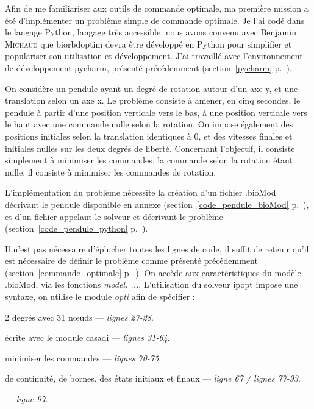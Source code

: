 Afin de me familiariser aux outils de commande optimale, ma première mission a été d'implémenter un problème simple de commande optimale. Je l'ai codé dans le langage Python, langage très accessible, nous avons convenu avec Benjamin \textsc{Michaud} que \gls{biorbdoptim} devra être développé en Python pour simplifier et populariser son utilisation et développement. J'ai travaillé avec l'environnement de développement \gls{pycharm}, présenté précédemment (section~\ref{pycharm} p.~\pageref{pycharm}).

On considère un pendule ayant un degré de rotation autour d'un axe y, et une translation selon un axe x. Le problème consiste à amener, en cinq secondes, le pendule à partir d'une position verticale vers le bas, à une position verticale vers le haut avec une commande nulle selon la rotation. On impose également des positions initiales selon la translation identiques à 0, et des vitesses finales et initiales nulles sur les deux degrés de liberté. Concernant l'objectif, il consiste simplement à minimiser les commandes, la commande selon la rotation étant nulle, il consiste à minimiser les commandes de rotation.

L'implémentation du problème nécessite la création d'un fichier .bioMod décrivant le pendule disponible en annexe 
(section~\ref{code_pendule_bioMod} p.~\pageref{code_pendule_bioMod}), et d'un fichier appelant le solveur et décrivant le problème (section~\ref{code_pendule_python} p.~\pageref{code_pendule_python}).

Il n'est pas nécessaire d’éplucher toutes les lignes de code, il suffit de retenir qu'il est nécessaire de définir le problème comme présenté précédemment (section~\ref{commande_optimale} p.~\pageref{commande_optimale}).  On accède aux caractéristiques du modèle .bioMod, via les fonctions \emph{model. ...}.
L'utilisation du solveur ipopt impose une syntaxe, on utilise le module \emph{opti} afin de spécifier :
\label{pendule}
\begin{description}
\setlength\itemsep{-0.2em}
\item [les degrés de liberté et le nombre de nœuds :] 2 degrés avec 31 nœuds --- \emph{lignes 27-28}.
\item [le système dynamique :] écrite avec le module casadi --- \emph{lignes 31-64}.
\item [les fonctions objectifs :] minimiser les commandes --- \emph{lignes 70-75}.
\item [les contraintes :] de continuité, de bornes, des états initiaux et finaux --- \emph{ligne 67 / lignes 77-93}.
\item [l'appel au solveur] --- \emph{ligne 97}.
\end{description}


